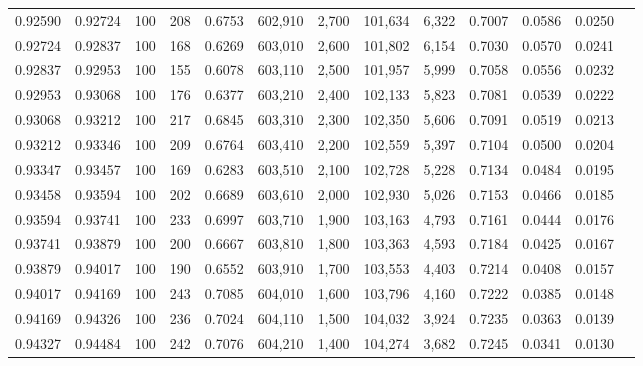 \begin{tabular}{rrrrrrrrrrrrr}
0.92590 & 0.92724 &   100 & 208 &                                     0.6753 & 602,910 &   2,700 & 101,634 &   6,322 & 0.7007 & 0.0586 & 0.0250 \\
0.92724 & 0.92837 &   100 & 168 &                                     0.6269 & 603,010 &   2,600 & 101,802 &   6,154 & 0.7030 & 0.0570 & 0.0241 \\
0.92837 & 0.92953 &   100 & 155 &                                     0.6078 & 603,110 &   2,500 & 101,957 &   5,999 & 0.7058 & 0.0556 & 0.0232 \\
0.92953 & 0.93068 &   100 & 176 &                                     0.6377 & 603,210 &   2,400 & 102,133 &   5,823 & 0.7081 & 0.0539 & 0.0222 \\
0.93068 & 0.93212 &   100 & 217 &                                     0.6845 & 603,310 &   2,300 & 102,350 &   5,606 & 0.7091 & 0.0519 & 0.0213 \\
0.93212 & 0.93346 &   100 & 209 &                                     0.6764 & 603,410 &   2,200 & 102,559 &   5,397 & 0.7104 & 0.0500 & 0.0204 \\
0.93347 & 0.93457 &   100 & 169 &                                     0.6283 & 603,510 &   2,100 & 102,728 &   5,228 & 0.7134 & 0.0484 & 0.0195 \\
0.93458 & 0.93594 &   100 & 202 &                                     0.6689 & 603,610 &   2,000 & 102,930 &   5,026 & 0.7153 & 0.0466 & 0.0185 \\
0.93594 & 0.93741 &   100 & 233 &                                     0.6997 & 603,710 &   1,900 & 103,163 &   4,793 & 0.7161 & 0.0444 & 0.0176 \\
0.93741 & 0.93879 &   100 & 200 &                                     0.6667 & 603,810 &   1,800 & 103,363 &   4,593 & 0.7184 & 0.0425 & 0.0167 \\
0.93879 & 0.94017 &   100 & 190 &                                     0.6552 & 603,910 &   1,700 & 103,553 &   4,403 & 0.7214 & 0.0408 & 0.0157 \\
0.94017 & 0.94169 &   100 & 243 &                                     0.7085 & 604,010 &   1,600 & 103,796 &   4,160 & 0.7222 & 0.0385 & 0.0148 \\
0.94169 & 0.94326 &   100 & 236 &                                     0.7024 & 604,110 &   1,500 & 104,032 &   3,924 & 0.7235 & 0.0363 & 0.0139 \\
0.94327 & 0.94484 &   100 & 242 &                                     0.7076 & 604,210 &   1,400 & 104,274 &   3,682 & 0.7245 & 0.0341 & 0.0130 \\

\end{tabular}
